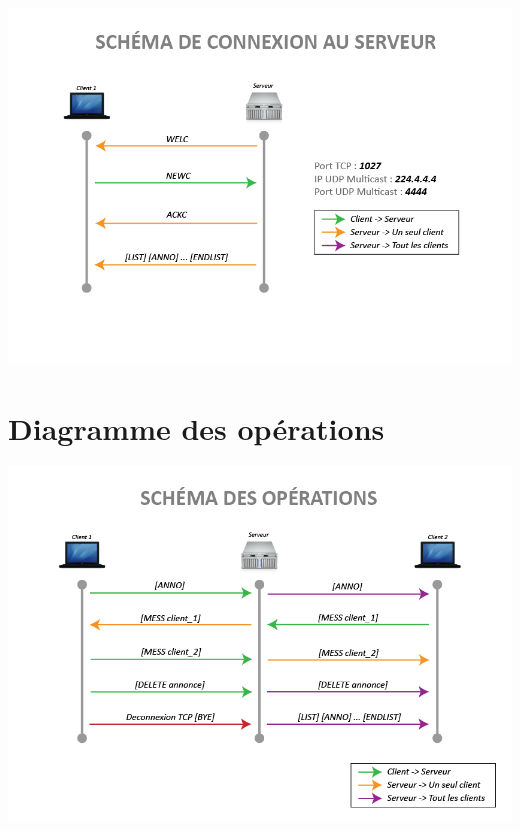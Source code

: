 \documentclass[12pt]{article}
\begin{document}
\includegraphics[width=\textwidth]{rendu1/Protocole_Connection.png}

\section{Diagramme des opérations}

\includegraphics[width=\textwidth]{rendu1/Protocole_Operations.png}
\end{document}
